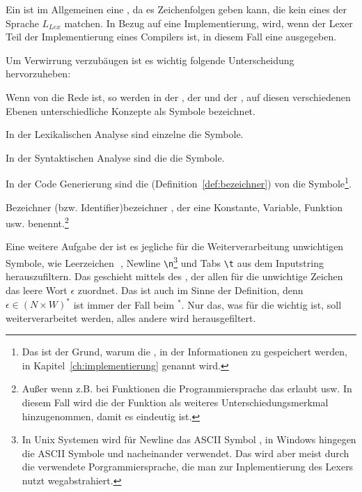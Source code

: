 Ein  ist im Allgemeinen eine , da es Zeichenfolgen geben kann, die kein  eines  der Sprache $L_{Lex}$ matchen. In Bezug auf eine Implementierung, wird, wenn der Lexer Teil der Implementierung eines Compilers ist, in diesem Fall eine  ausgegeben.

\begin{Special_Paragraph}
  Um Verwirrung verzubäugen ist es wichtig folgende Unterscheidung hervorzuheben:

  Wenn von  die Rede ist, so werden in der , der  und der , auf diesen verschiedenen Ebenen unterschiedliche Konzepte als Symbole bezeichnet.

  In der Lexikalischen Analyse sind einzelne  die Symbole.

  In der Syntaktischen Analyse sind die  die Symbole.

  In der Code Generierung sind die  (Definition~\ref{def:bezeichner}) von  die Symbole\footnote{Das ist der Grund, warum die , in der Informationen zu  gespeichert werden, in Kapitel~\ref{ch:implementierung}  genannt wird.}.
\end{Special_Paragraph}

\begin{Definition}{Bezeichner (bzw. Identifier)}{bezeichner}
  , der eine Konstante, Variable, Funktion usw.  benennt.\footnote{Außer wenn z.B. bei Funktionen die Programmiersprache das  erlaubt usw. In diesem Fall wird die  der Funktion als weiteres Unterschiedungsmerkmal hinzugenommen, damit es eindeutig ist.}
\end{Definition}

Eine weitere Aufgabe der  ist es jegliche für die Weiterverarbeitung unwichtigen Symbole, wie Leerzeichen \,\textvisiblespace\,, Newline \verb|\n|\footnote{In Unix Systemen wird für Newline das ASCII Symbol , in Windows hingegen die ASCII Symbole  und  nacheinander verwendet. Das wird aber meist durch die verwendete Porgrammiersprache, die man zur Inplementierung des Lexers nutzt wegabstrahiert.} und Tabs \verb|\t| aus dem Inputstring herauszufiltern. Das geschieht mittels des , der allen für die  unwichtige Zeichen das leere Wort $\epsilon$ zuordnet. Das ist auch im Sinne der Definition, denn $\epsilon \in (N\times W)^{*}$ ist immer der Fall beim  $^{*}$. Nur das, was für die  wichtig ist, soll weiterverarbeitet werden, alles andere wird herausgefiltert.

